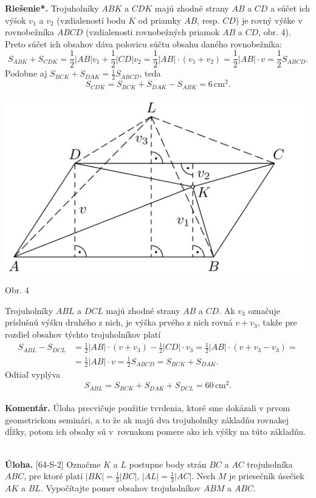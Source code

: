 \documentclass[11pt,a4paper,oneside,final]{book}
\newcommand{\kom}{\textbf{Komentár.} }
\newcommand{\ul}{\textbf{Úloha.} }
\newcommand{\rieh}{\textbf{Riešenie*.} }
\begin{document}
\rieh Trojuholníky $ABK$ a $CDK$ majú zhodné strany $AB$ a $CD$ a súčet ich výšok $v_1$ a $v_2$ (vzdialeností bodu $K$ od priamky $AB$, resp. $CD$) je rovný výške v rovnobežníka $ABCD$ (vzdialenosti rovnobežných priamok $AB$ a $CD$, obr. 4). Preto súčet ich obsahov dáva polovicu súčtu obsahu daného rovnobežníka:
$$S_{ABK} + S_{CDK} = \frac{1}{2} |AB|v_1 +\frac{1}{2} |CD|v_2 = \frac{1}{2}|AB| \cdot (v_1 + v_2 ) =\frac{1}{2}|AB| \cdot v =\frac{1}{2} S_{ABCD}.$$
Podobne aj $S_{BCK} + S_{DAK} =\frac{1}{2} S_{ABCD}$, teda
$$S_{CDK} = S_{BCK} + S_{DAK} - S_{ABK}= 6\,\text{cm}^2.$$
\begin{center}
\includegraphics{62K2}

Obr. 4
\end{center}
Trojuholníky $ABL$ a $DCL$ majú zhodné strany $AB$ a $CD$. Ak $v_3$ označuje príslušnú výšku druhého z nich, je výška prvého z nich rovná $v + v_3$, takže pre rozdiel obsahov týchto trojuholníkov platí
\begin{align*}
S_{ABL} - S_{DCL} &= \frac{1}{2} |AB| \cdot (v + v_3 ) - \frac{1}{2}|CD|\cdot v_3 =\frac{1}{2} |AB| \cdot (v + v_3 - v_3 ) =\\
&= \frac{1}{2} |AB| \cdot v = \frac{1}{2} S_{ABCD} = S_{BCK} + S_{DAK}.
\end{align*}
Odtiaľ vyplýva
$$S_{ABL} = S_{BCK} + S_{DAK} + S_{DCL} = 60\,\text{cm}^2.$$
\\
\kom Úloha precvičuje použitie tvrdenia, ktoré sme dokázali v prvom geometrickom seminári, a to že ak majú dva trojuholníky základňu rovnakej dĺžky, potom ich obsahy sú v~rovnakom pomere ako ich výšky na túto základňu.\\
\\
\begin{tcolorbox}[breakable,notitle,boxrule=0pt,colback=light-gray,colframe=light-gray]\ul [64-S-2] Označme $K$ a $L$ postupne body strán $BC$ a $AC$ trojuholníka $ABC$, pre ktoré platí $|BK|= \frac{1}{3}|BC|$, $|AL| =\frac{1}{3}|AC|$. Nech $M$ je priesečník úsečiek $AK$ a $BL$. Vypočítajte pomer obsahov trojuholníkov $ABM$ a $ABC$.

\end{tcolorbox}
\end{document}
